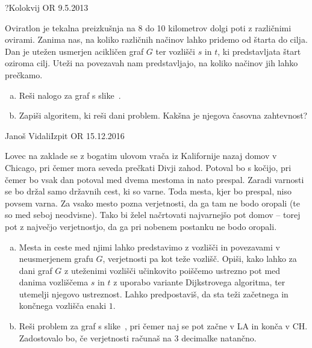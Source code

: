 \begin{naloga}{?}{Kolokvij OR 9.5.2013}
\begin{vprasanje}[oviratlon]
Oviratlon je tekalna preizkušnja
na 8 do 10 kilometrov dolgi poti z različnimi ovirami.
Zanima nas, na koliko različnih načinov lahko pridemo od štarta do cilja.
Dan je utežen usmerjen acikličen graf $G$ ter vozlišči $s$ in $t$,
ki predstavljata štart oziroma cilj.
Uteži na povezavah nam predstavljajo,
na koliko načinov jih lahko prečkamo.

\begin{enumerate}[(a)]
\item Reši nalogo za graf s slike~\fig{}.

\item Zapiši algoritem, ki reši dani problem.
Kakšna je njegova časovna zahtevnost?
\end{enumerate}

\begin{slika}
\pgfslika
{}
\end{slika}
\end{vprasanje}
\begin{odgovor}
\end{odgovor}
\end{naloga}


\begin{naloga}{Janoš Vidali}{Izpit OR 15.12.2016}
\begin{vprasanje}[zaklad]
Lovec na zaklade se z bogatim ulovom
vrača iz Kalifornije nazaj domov v Chicago,
pri čemer mora seveda prečkati Divji zahod.
Potoval bo s kočijo,
pri čemer bo vsak dan potoval med dvema mestoma in nato prespal.
Zaradi varnosti se bo držal samo državnih cest, ki so varne.
Toda mesta, kjer bo prespal, niso povsem varna.
Za vsako mesto pozna verjetnosti,
da ga tam ne bodo oropali (te so med seboj neodvisne).
Tako bi želel načrtovati najvarnejšo pot domov
-- torej pot z največjo verjetnostjo,
da ga pri nobenem postanku ne bodo oropali.

\begin{enumerate}[(a)]
\item Mesta in ceste med njimi lahko predstavimo z vozlišči in povezavami
v ne\-usme\-rje\-nem grafu $G$, verjetnosti pa kot teže vozlišč.
Opiši, kako lahko za dani graf $G$ z uteženimi vozlišči
učinkovito poiščemo ustrezno pot med danima vozliščema $s$ in $t$
z uporabo variante Dijkstrovega algoritma,
ter utemelji njegovo ustreznost.
Lahko predpostaviš, da sta teži začetnega in končnega vozlišča enaki $1$.

\item Reši problem za graf s slike~\fig{},
pri čemer naj se pot začne v LA in konča v CH.
Zadostovalo bo, če verjetnosti računaš na $3$ decimalke natančno.
\end{enumerate}

\begin{slika}
\pgfslika
{}
\end{slika}
\end{vprasanje}
\begin{odgovor}
\end{odgovor}
\end{naloga}


